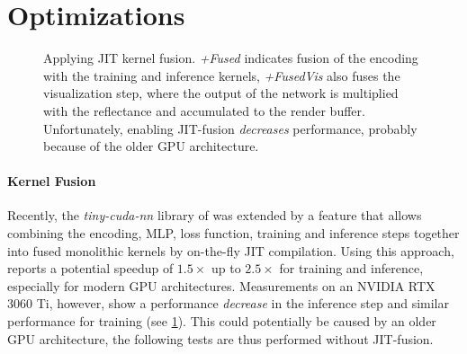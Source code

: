 \section{Optimizations}

\begin{figure}[htb!]
    \centering
    
    \caption{Applying JIT kernel fusion. \emph{+Fused} indicates fusion of the encoding with the training and inference kernels, \emph{+FusedVis} also fuses the visualization step, where the output of the network is multiplied with the reflectance and accumulated to the render buffer. Unfortunately, enabling JIT-fusion \emph{decreases} performance, probably because of the older GPU architecture.}
    \label{fig:jit}
\end{figure}
\paragraph{Kernel Fusion} Recently, the \emph{tiny-cuda-nn} library of \textcite{muller2021a} was extended by a feature that allows combining the encoding, MLP, loss function, training and inference steps together into fused monolithic kernels by on-the-fly JIT compilation.
Using this approach, \textcite{muller2021a} reports a potential speedup of $1.5\times$ up to $2.5\times$ for training and inference, especially for modern GPU architectures.
Measurements on an NVIDIA RTX 3060 Ti, however, show a performance \emph{decrease} in the inference step and similar performance for training (see \cref{fig:jit}).
This could potentially be caused by an older GPU architecture, the following tests are thus performed without JIT-fusion.

